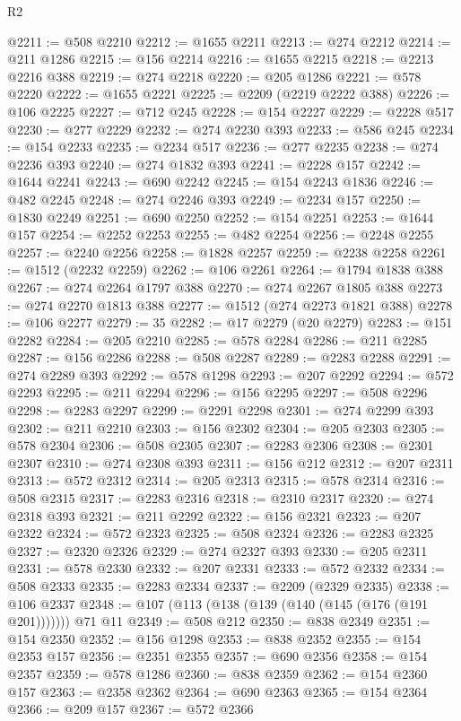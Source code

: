 \begin{lexlean}{R2}
\begin{coremodule}
@2211 := @508 @2210
@2212 := @1655 @2211
@2213 := @274 @2212
@2214 := @211 @1286
@2215 := @156 @2214
@2216 := @1655 @2215
@2218 := @2213 @2216 @388
@2219 := @274 @2218
@2220 := @205 @1286
@2221 := @578 @2220
@2222 := @1655 @2221
@2225 := @2209 (@2219 @2222 @388)
@2226 := @106 @2225
@2227 := @712 @245
@2228 := @154 @2227
@2229 := @2228 @517
@2230 := @277 @2229
@2232 := @274 @2230 @393
@2233 := @586 @245
@2234 := @154 @2233
@2235 := @2234 @517
@2236 := @277 @2235
@2238 := @274 @2236 @393
@2240 := @274 @1832 @393
@2241 := @2228 @157
@2242 := @1644 @2241
@2243 := @690 @2242
@2245 := @154 @2243 @1836
@2246 := @482 @2245
@2248 := @274 @2246 @393
@2249 := @2234 @157
@2250 := @1830 @2249
@2251 := @690 @2250
@2252 := @154 @2251
@2253 := @1644 @157
@2254 := @2252 @2253
@2255 := @482 @2254
@2256 := @2248 @2255
@2257 := @2240 @2256
@2258 := @1828 @2257
@2259 := @2238 @2258
@2261 := @1512 (@2232 @2259)
@2262 := @106 @2261
@2264 := @1794 @1838 @388
@2267 := @274 @2264 @1797 @388
@2270 := @274 @2267 @1805 @388
@2273 := @274 @2270 @1813 @388
@2277 := @1512 (@274 @2273 @1821 @388)
@2278 := @106 @2277
@2279 := 35
@2282 := @17 @2279 (@20 @2279)
@2283 := @151 @2282
@2284 := @205 @2210
@2285 := @578 @2284
@2286 := @211 @2285
@2287 := @156 @2286
@2288 := @508 @2287
@2289 := @2283 @2288
@2291 := @274 @2289 @393
@2292 := @578 @1298
@2293 := @207 @2292
@2294 := @572 @2293
@2295 := @211 @2294
@2296 := @156 @2295
@2297 := @508 @2296
@2298 := @2283 @2297
@2299 := @2291 @2298
@2301 := @274 @2299 @393
@2302 := @211 @2210
@2303 := @156 @2302
@2304 := @205 @2303
@2305 := @578 @2304
@2306 := @508 @2305
@2307 := @2283 @2306
@2308 := @2301 @2307
@2310 := @274 @2308 @393
@2311 := @156 @212
@2312 := @207 @2311
@2313 := @572 @2312
@2314 := @205 @2313
@2315 := @578 @2314
@2316 := @508 @2315
@2317 := @2283 @2316
@2318 := @2310 @2317
@2320 := @274 @2318 @393
@2321 := @211 @2292
@2322 := @156 @2321
@2323 := @207 @2322
@2324 := @572 @2323
@2325 := @508 @2324
@2326 := @2283 @2325
@2327 := @2320 @2326
@2329 := @274 @2327 @393
@2330 := @205 @2311
@2331 := @578 @2330
@2332 := @207 @2331
@2333 := @572 @2332
@2334 := @508 @2333
@2335 := @2283 @2334
@2337 := @2209 (@2329 @2335)
@2338 := @106 @2337
@2348 := @107 (@113 (@138 (@139 (@140 (@145 (@176 (@191 @201))))))) @71 @11
@2349 := @508 @212
@2350 := @838 @2349
@2351 := @154 @2350
@2352 := @156 @1298
@2353 := @838 @2352
@2355 := @154 @2353 @157
@2356 := @2351 @2355
@2357 := @690 @2356
@2358 := @154 @2357
@2359 := @578 @1286
@2360 := @838 @2359
@2362 := @154 @2360 @157
@2363 := @2358 @2362
@2364 := @690 @2363
@2365 := @154 @2364
@2366 := @209 @157
@2367 := @572 @2366

\end{coremodule}
\end{lexlean}
